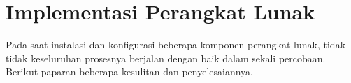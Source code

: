 
\section{Implementasi Perangkat Lunak}
Pada saat instalasi dan konfigurasi beberapa komponen perangkat lunak, tidak tidak keseluruhan prosesnya berjalan dengan baik dalam sekali percobaan. Berikut paparan beberapa kesulitan dan penyelesaiannya.
	  
	
	
	
	
  
  
  
  
  
  
